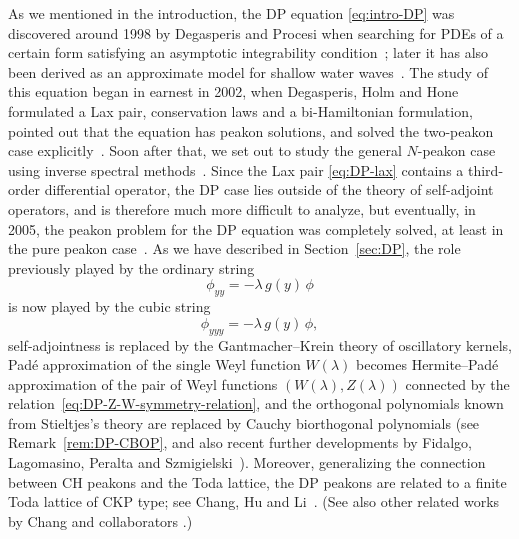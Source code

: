 \documentclass[10pt,a4paper]{article} \pdfoutput=1 
\begin{document}
As we mentioned in the introduction,
the DP equation \eqref{eq:intro-DP} was discovered around 1998 by Degasperis and Procesi
when searching for PDEs of a certain form satisfying an asymptotic integrability
condition~\cite{degasperis-procesi:1999:asymptotic-integrability};
later it has also been derived as an approximate model for
shallow water waves~\cite{johnson:2003:classical-water-waves,
  dullin-gottwald-holm:2004:asymptotically-equivalent-shallow-water,
  constantin-lannes:2009:hydrodynamical-CH-DP}.
The study of this equation began in earnest in 2002, when
Degasperis, Holm and Hone formulated a Lax pair, conservation laws
and a bi-Hamiltonian formulation,
pointed out that the equation has peakon solutions,
and solved the two-peakon case explicitly~\cite{degasperis-holm-hone:2002:new-integrable-equation-DP}.
Soon after that, we set out to study the general $N$-peakon case using inverse spectral
methods~\cite{lundmark-szmigielski:2003:DPshort}.
Since the Lax pair \eqref{eq:DP-lax} contains a third-order differential operator,
the DP case lies outside of the theory of self-adjoint operators,
and is therefore much more difficult to analyze,
but eventually, in 2005, the peakon problem for the DP equation was completely solved,
at least in the pure peakon case~\cite{lundmark-szmigielski:2005:DPlong}.
As we have described in Section~\ref{sec:DP},
the role previously played by the ordinary string
\begin{equation*}
  \phi_{yy} = -\lambda \, g(y) \, \phi
\end{equation*}
is now played by the cubic string
\begin{equation*}
  \phi_{yyy} = -\lambda \, g(y) \, \phi
  ,
\end{equation*}
self-adjointness is replaced by the Gantmacher--Krein theory of oscillatory kernels,
Padé approximation of the single Weyl function $W(\lambda)$ becomes Hermite--Padé approximation
of the pair of Weyl functions $(W(\lambda),Z(\lambda))$
connected by the relation~\eqref{eq:DP-Z-W-symmetry-relation},
and the orthogonal polynomials known from Stieltjes's theory are replaced by
Cauchy biorthogonal polynomials
(see Remark~\ref{rem:DP-CBOP},
and also recent further developments by
Fidalgo, Lagomasino, Peralta and Szmigielski~\cite{lopezlagomasino-medinaperalta-szmigielski:2019:mixed-type-hermite-pade-approximation-inspired-by-DP, fidalgo-lopezlagomasino-medinaperalta:2020:asymptotics-cauchy-biorthogonal-polynomials, medinaperalta:2021:matrix-cauchy-biorthogonal-polynomials}).
Moreover, generalizing the connection between CH peakons and the Toda lattice,
the DP peakons are related to a finite Toda lattice of CKP type;
see Chang, Hu and Li~\cite{chang-hu-li:2018:DP-peakons-Toda-lattice-CKP}.
(See also other related works by Chang and collaborators
\cite{chang-hu-li:2018:moment-modification-multipeakons,
  chang-he-hu-li:2018:partial-skew-orthogonal-polynomials-integrable-lattices-Pfaffian,
  chang-hu-szmigielski:2016:two-component-mCH-Kac-vanMoerbeke,
  chang-hu-szmigielski-zhedanov:2020:isospectral-frobenius-stickelberger-thiele-polynomials,
  chang-chen-hu:2014:generalized-nonisospectral-CH-peakons}.)
\end{document}
